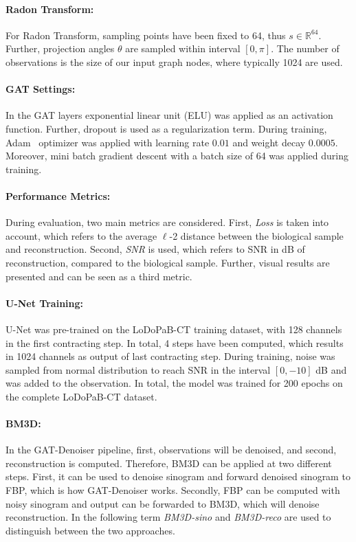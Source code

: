 \paragraph{Radon Transform:}
For Radon Transform, sampling points have been fixed to 64, thus $s \in \mathbb{R}^{64}$.
Further, projection angles $\theta$ are sampled within interval $[0, \pi]$.
The number of observations is the size of our input graph nodes, where typically 1024 are used.

\paragraph{GAT Settings:}
In the GAT layers exponential linear unit (ELU) was applied as an activation function.
Further, dropout is used as a regularization term.
During training, Adam~\cite{adam} optimizer was applied with learning rate $0.01$ and weight decay $0.0005$.
Moreover, mini batch gradient descent with a batch size of 64 was applied during training.

\paragraph{Performance Metrics:}
During evaluation, two main metrics are considered.
First, \textit{Loss} is taken into account, which refers to the average $\ell$-2 distance between the biological sample and reconstruction.
Second, \textit{SNR} is used, which refers to SNR in dB of reconstruction, compared to the biological sample.
Further, visual results are presented and can be seen as a third metric.


\paragraph{U-Net Training:}
U-Net was pre-trained on the LoDoPaB-CT training dataset, with 128 channels in the first contracting step. 
In total, 4 steps have been computed, which results in 1024 channels as output of last contracting step.
During training, noise was sampled from normal distribution to reach SNR in the interval $[0, -10]$ dB 
and was added to the observation. In total, the model was trained for 200 epochs on the complete LoDoPaB-CT dataset.

\paragraph{BM3D:}
In the GAT-Denoiser pipeline, first, observations will be denoised, and second, reconstruction is computed.
Therefore, BM3D can be applied at two different steps. First, it can be used to denoise sinogram
and forward denoised sinogram to FBP, which is how GAT-Denoiser works. Secondly, FBP can be
computed with noisy sinogram and output can be forwarded to BM3D, which will denoise reconstruction.
In the following term \textit{BM3D-sino} and \textit{BM3D-reco} are used to distinguish between the two approaches.

